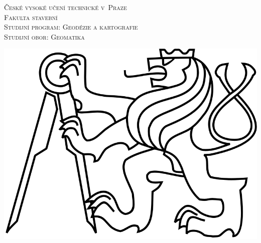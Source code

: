 \documentclass[12pt]{article}
\begin{document}
\begin{titlepage}
\center %
 

\textsc{\LARGE České vysoké učení technické v~Praze}\\[0.5cm] %
\textsc{\Large Fakulta stavební}\\[0.5cm] %
\textsc{\large Studijní program: Geodézie a kartografie}\\[0.5cm] %
\textsc{\large Studijní obor: Geomatika}\\[0.5cm] %


\vspace{50pt}

\includegraphics[scale=1.2]{images/cvut_logo.png}  %


\vspace{40pt}


\end{titlepage}
\end{document}
